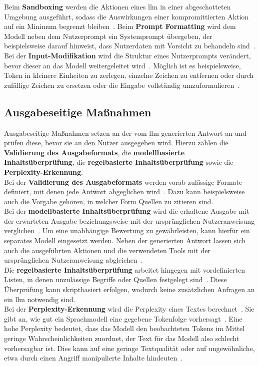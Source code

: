 Beim \textbf{Sandboxing} werden die Aktionen eines \ac{llm} in einer abgeschotteten Umgebung ausgeführt, sodass die Auswirkungen einer kompromittierten Aktion auf ein Minimum
begrenzt bleiben~\cite[4]{sm08}. Beim \textbf{Prompt Formatting} wird dem Modell neben dem Nutzerprompt ein Systemprompt übergeben, der beispielsweise darauf hinweist, dass
Nutzerdaten mit Vorsicht zu behandeln sind~\cite[9]{sm10}.
Bei der \textbf{Input-Modifikation} wird die Struktur eines Nutzerprompts verändert, bevor dieser an das Modell weitergeleitet wird~\cite[9]{sm10}. Möglich ist es beispielsweise,
Token in kleinere Einheiten zu zerlegen, einzelne Zeichen zu entfernen oder durch zufällige Zeichen zu ersetzen oder die Eingabe vollständig umzuformulieren~\cite[6]{sm11}.

\subsection{Ausgabeseitige Maßnahmen}

Ausgabeseitige Maßnahmen setzen an der vom \ac{llm} generierten Antwort an und prüfen diese, bevor sie an den Nutzer ausgegeben wird. Hierzu zählen die 
\textbf{Validierung des Ausgabeformats}, die \textbf{modellbasierte Inhaltsüberprüfung}, die \textbf{regelbasierte Inhaltsüberprüfung} sowie die \textbf{Perplexity-Erkennung}. \\
Bei der \textbf{Validierung des Ausgabeformats} werden vorab zulässige Formate definiert, mit denen jede Antwort abgeglichen wird~\cite{pi15}. Dazu kann beispielsweise auch die Vorgabe
gehören, in welcher Form Quellen zu zitieren sind. \\
Bei der \textbf{modellbasierte Inhaltsüberprüfung} wird die erhaltene Ausgabe mit der erwarteten Ausgabe beziehungsweise mit der ursprünglichen Nutzeranweisung verglichen~\cite[55]{pi1}.
Um eine unabhängige Bewertung zu gewährleisten, kann hierfür ein separates Modell eingesetzt werden. Neben der generierten Antwort lassen sich auch die ausgeführten
Aktionen und die verwendeten Tools mit der ursprünglichen Nutzeranweisung abgleichen~\cite[7]{sm09}. \\
Die \textbf{regelbasierte Inhaltsüberprüfung} arbeitet hingegen mit vordefinierten Listen, in denen unzulässige Begriffe oder Quellen festgelegt sind~\cite[55]{pi1}. Diese
Überprüfung kann skriptbasiert erfolgen, wodurch keine zusätzlichen Anfragen an ein \ac{llm} notwendig sind. \\
Bei der \textbf{Perplexity-Erkennung} wird die Perplexity eines Textes berechnet~\cite[6]{sm11}. Sie gibt an, wie gut ein Sprachmodell eine gegebene Tokenfolge vorhersagt~\cite{sm13}.
Eine hohe Perplexity bedeutet, dass das Modell den beobachteten Tokens im Mittel geringe Wahrscheinlichkeiten zuordnet, der Text für das Modell also schlecht
vorhersagbar ist. Dies kann auf eine geringe Textqualität oder auf ungewöhnliche, etwa durch einen Angriff manipulierte Inhalte hindeuten~\cite{sm13}.

